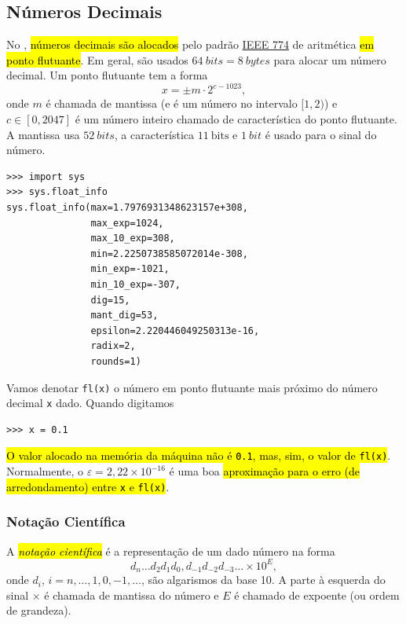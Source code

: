 \subsection{Números Decimais}\label{cap_lingua_sec_numop:subsec:float}

No {\python}, \hl{números decimais são alocados} pelo padrão \href{https://en.wikipedia.org/wiki/IEEE\_754}{IEEE 774} de aritmética \hl{em ponto flutuante}. Em geral, são usados $64~\textit{bits} = 8~\textit{bytes}$ para alocar um número decimal. Um ponto flutuante tem a forma
\begin{equation}
  x = \pm m\cdot 2^{c-1023},
\end{equation}
onde $m$ é chamada de mantissa (e é um número no intervalo $[1,2)$) e $c\in [0, 2047]$ é um número inteiro chamado de característica do ponto flutuante. A mantissa usa $52~\textit{bits}$, a característica $11~\text{bits}$ e $1~\textit{bit}$ é usado para o sinal do número.

\begin{lstlisting}
>>> import sys
>>> sys.float_info
sys.float_info(max=1.7976931348623157e+308, 
               max_exp=1024, 
               max_10_exp=308, 
               min=2.2250738585072014e-308, 
               min_exp=-1021, 
               min_10_exp=-307, 
               dig=15, 
               mant_dig=53, 
               epsilon=2.220446049250313e-16, 
               radix=2, 
               rounds=1)
\end{lstlisting}

Vamos denotar \lstinline+fl(x)+ o número em ponto flutuante mais próximo do número decimal \lstinline+x+ dado. Quando digitamos

\begin{lstlisting}
>>> x = 0.1
\end{lstlisting}

\hl{O valor alocado na memória da máquina não é \texttt{0.1}, mas, sim, o valor de \texttt{fl(x)}}. Normalmente, o  $\varepsilon = 2,22\times 10^{-16}$ é uma boa \hl{aproximação para o erro (de arredondamento) entre \texttt{x} e \texttt{fl(x)}}.

\subsubsection{Notação Científica}

A \hl{\emph{notação científica}} é a representação de um dado número na forma
\begin{equation}
  d_{n}\ldots d_2d_1d_0,d_{-1}d_{-2}d_{-3}\ldots \times 10^{E},
\end{equation}
onde $d_i$, $i=n, \ldots, 1, 0, -1, \ldots$, são algarismos da base 10. A parte à esquerda do sinal $\times$ é chamada de mantissa do número e $E$ é chamado de expoente (ou ordem de grandeza).

